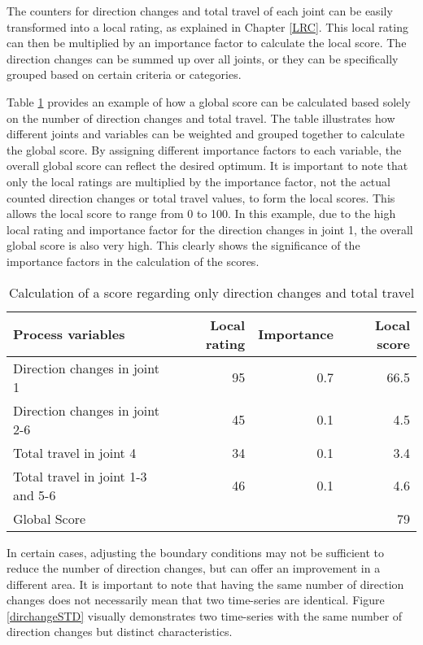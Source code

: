 \documentclass[conference]{IEEEtran}
\begin{document}
The counters for direction changes and total travel of each joint can be easily transformed into a local rating, as explained in Chapter \ref{LRC}. This local rating can then be multiplied by an importance factor to calculate the local score. The direction changes can be summed up over all joints, or they can be specifically grouped based on certain criteria or categories.  

Table \ref{exampleDirTravel} provides an example of how a global score can be calculated based solely on the number of direction changes and total travel. The table illustrates how different joints and variables can be weighted and grouped together to calculate the global score. By assigning different importance factors to each variable, the overall global score can reflect the desired optimum. It is important to note that only the local ratings are multiplied by the importance factor, not the actual counted direction changes or total travel values, to form the local scores. This allows the local score to range from 0 to 100. In this example, due to the high local rating and importance factor for the direction changes in joint 1, the overall global score is also very high. This clearly shows the significance of the importance factors in the calculation of the scores.

\begin{table}[H]
	\centering
	\caption{Calculation of a score regarding only direction changes and total travel}
	\begin{tabular}{||l|r|r|r||}
		Process variables & Local rating & Importance & Local score\\
		\hline
		\hline
		\hline
		
		Direction changes in joint 1 & 95 & 0.7 & 66.5\\
		Direction changes in joint 2-6 & 45& 0.1&4.5\\
		Total travel in joint 4& 34& 0.1&3.4\\
		Total travel in joint 1-3 and 5-6& 46&0.1&4.6\\
		\hline
		\hline
		\hline
		Global Score& & &79\\
		\hline
		\hline
	\end{tabular}
	
	
	\label{exampleDirTravel}
\end{table}


In certain cases, adjusting the boundary conditions may not be sufficient to reduce the number of direction changes, but can offer an improvement in a different area. It is important to note that having the same number of direction changes does not necessarily mean that two time-series are identical. Figure \ref{dirchangeSTD} visually demonstrates two time-series with the same number of direction changes but distinct characteristics.
\end{document}
